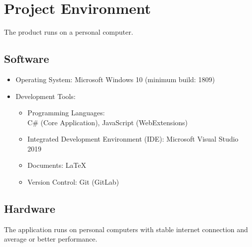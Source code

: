 \chapter{Project Environment}
\label{ch:environment}

The product runs on a personal computer.

\section{Software}
\begin{itemize}
\item[] Operating System: Microsoft Windows 10 (minimum build: 1809)

\item[] Development Tools:
	\begin{itemize}
	\item Programming Languages: \\C\# (Core Application), JavaScript (WebExtensions)
	\item Integrated Development Environment (IDE): Microsoft Visual Studio 2019
	\item Documents: LaTeX
	\item Version Control: Git (GitLab)
	\end{itemize}
\end{itemize}
\section{Hardware}

The application runs on personal computers with stable internet connection and average or better performance.